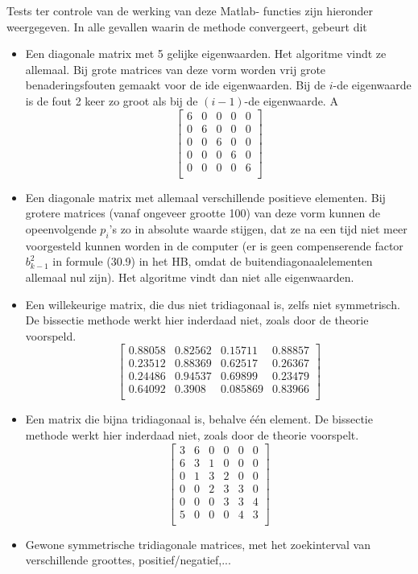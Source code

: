 \documentclass[]{article}
\begin{document}
Tests ter controle van de werking van deze Matlab- functies zijn hieronder weergegeven. In alle gevallen waarin de methode convergeert, gebeurt dit 
\begin{itemize}
	\item Een diagonale matrix met 5 gelijke eigenwaarden. Het algoritme vindt ze allemaal. Bij grote matrices van deze vorm worden vrij grote benaderingsfouten gemaakt voor de ide eigenwaarden. Bij de $i$-de eigenwaarde is de fout 2 keer zo groot als bij de $(i-1)$-de eigenwaarde.
	A\[\left[ \begin{array}{cccccc}
6 & 0 & 0 & 0 & 0 \\  
0 & 6 & 0 & 0 & 0 \\  
0 & 0 & 6 & 0 & 0 \\ 
0 & 0 & 0 & 6 & 0 \\ 
0 & 0 & 0 & 0 & 6 \\  
\end{array} \right] \]\linebreak

	\item Een diagonale matrix met allemaal verschillende positieve elementen. Bij  grotere matrices (vanaf ongeveer grootte 100) van deze vorm kunnen de opeenvolgende $p_i$'s zo in absolute waarde stijgen, dat ze na een tijd niet meer voorgesteld kunnen worden in de computer (er is geen compenserende factor $b_{k-1}^2$ in formule (30.9) in het HB, omdat de buitendiagonaalelementen allemaal nul zijn). Het algoritme vindt dan niet alle eigenwaarden.

	\item Een willekeurige matrix, die dus niet tridiagonaal is, zelfs niet symmetrisch. De bissectie methode werkt hier inderdaad niet, zoals door de theorie voorspeld.
\[	\left[	\begin{array}{ccccc}
0.88058&0.82562&0.15711&0.88857\\
0.23512&0.88369&0.62517&0.26367\\
0.24486&0.94537&0.69899&0.23479\\
0.64092&0.3908&0.085869&0.83966\\
\end{array}	\right]	\]\linebreak

	\item Een matrix die bijna tridiagonaal is, behalve \'{e}\'{e}n element. De bissectie methode werkt hier inderdaad niet, zoals door de theorie voorspelt.
	\[ \left[	\begin{array}{llllll}
3&6&0&0&0&0\\
6&3&1&0&0&0\\
0&1&3&2&0&0\\
0&0&2&3&3&0\\
0&0&0&3&3&4\\
5&0&0&0&4&3\\
\end{array}	\right] \]

	\item Gewone symmetrische tridiagonale matrices, met het zoekinterval van verschillende groottes, positief/negatief,...

\end{itemize}
\end{document}
